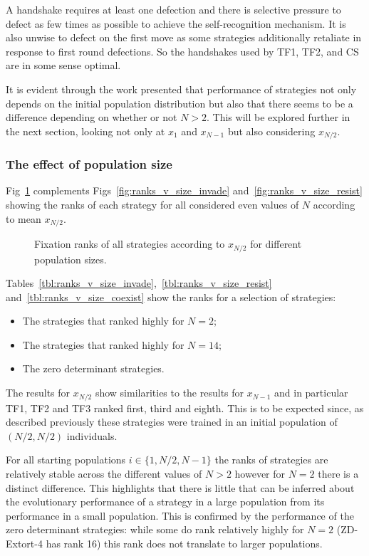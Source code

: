 \documentclass[10pt,letterpaper]{article}
\begin{document}
A handshake requires at least one defection and there is
selective pressure to defect as few times as possible to achieve the
self-recognition mechanism. It is also unwise to defect on the first move as
some strategies additionally retaliate in response to first round defections. So the
handshakes used by TF1, TF2, and CS are in some sense optimal.

It is evident through
the work presented that performance of strategies not only depends
on the initial population distribution but also that there seems to be a
difference depending on whether or not \(N>2\). This will be explored further in
the next section, looking not only at \(x_1\) and \(x_{N-1}\) but also
considering
\(x_{N/2}\).

\subsubsection*{The effect of population size}

Fig~\ref{fig:ranks_v_size_coexist} complements
Figs~\ref{fig:ranks_v_size_invade} and~\ref{fig:ranks_v_size_resist} showing the
ranks of each strategy for all considered even values of \(N\) according to mean
\(x_{N/2}\).

\begin{figure}[!hbtp]
    \centering
    \caption{Fixation ranks of all strategies according to \(x_{N/2}\) for different
    population sizes.}
    \label{fig:ranks_v_size_coexist}
\end{figure}

Tables~\ref{tbl:ranks_v_size_invade},~\ref{tbl:ranks_v_size_resist}
and~\ref{tbl:ranks_v_size_coexist} show the ranks for a selection of
strategies:

\begin{itemize}
    \item The strategies that ranked highly for \(N=2\);
    \item The strategies that ranked highly for \(N=14\);
    \item The zero determinant strategies.
\end{itemize}

The results for \(x_{N/2}\) show similarities to the results for \(x_{N-1}\) and
in particular TF1, TF2 and TF3 ranked first, third and eighth. This is to be
expected since, as described previously these strategies
were trained in an initial population of \((N/2, N/2)\) individuals.

For all starting populations
\(i\in\{1, N/2, N-1\}\) the ranks of strategies are relatively stable across the
different values of \(N>2\) however for \(N=2\) there is a distinct difference.
This highlights that there is little that can be inferred about the evolutionary
performance of a strategy in a large population from its performance in a small
population. This is confirmed by the performance of the zero determinant strategies: while
some do rank relatively highly for \(N=2\) (ZD-Extort-4 has rank 16) this rank
does not translate to larger populations.
\end{document}
